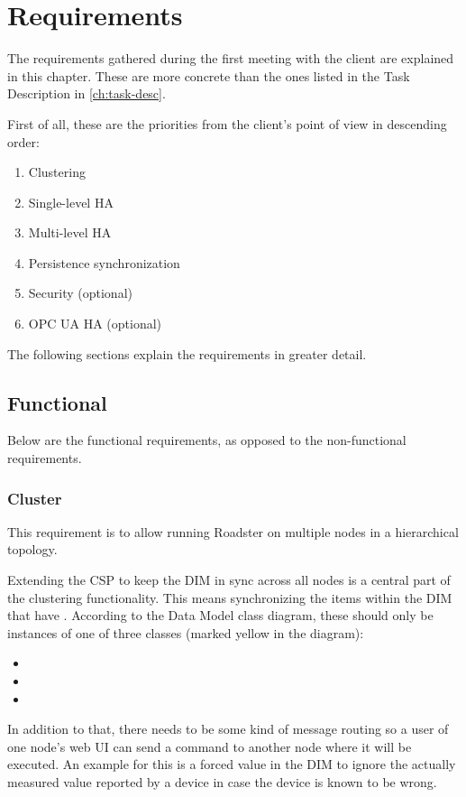 \chapter{Requirements}
The requirements gathered during the first meeting with the client are
explained in this chapter. These are more concrete than the ones listed in the
Task Description in \autoref{ch:task-desc}.

First of all, these are the priorities from the client's point of view in
descending order:

\begin{enumerate}
\item Clustering
\item Single-level \gls{HA}
\item Multi-level \gls{HA}
\item Persistence synchronization
\item Security (optional)
\item OPC UA \gls{HA} (optional)
\end{enumerate}

The following sections explain the requirements in greater detail.

\section{Functional}
Below are the functional requirements, as opposed to the non-functional
requirements.


\subsection{Cluster}
This requirement is to allow running Roadster on multiple nodes in a
hierarchical topology.

Extending the \gls{CSP} to keep the \gls{DIM} in sync across all nodes is a central
part of the clustering functionality. This means synchronizing the
items within the DIM that have . According to
the Data Model class diagram, these should only be instances of one of three
classes (marked yellow in the diagram):
\begin{itemize}
	\item {}
	\item {}
	\item {}
\end{itemize}

In addition to that, there needs to be some kind of message routing so a user
of one node's web UI can send a command to another node where it will be
executed. An example for this is a forced value in the DIM to ignore the
actually measured value reported by a device in case the device is known to be
wrong.

